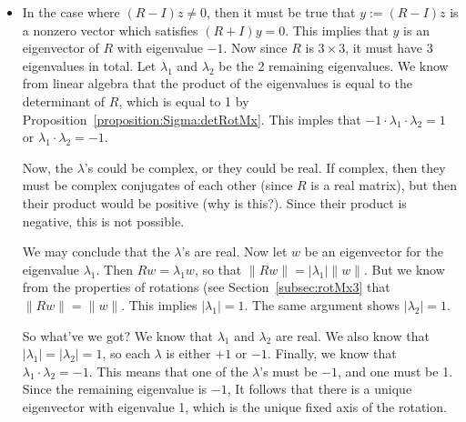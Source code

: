 \begin{itemize}
\item
In the case where $(R-I)z \neq 0$, then it must be true that $y := (R-I)z$ is a nonzero vector which satisfies $(R+I)y=0$. This implies that $y$ is an eigenvector of $R$ with eigenvalue $-1$. Now since $R$ is $3 \times 3$, it must have 3 eigenvalues in total. Let $\lambda_1$ and $\lambda_2$ be the 2 remaining eigenvalues.  We know from linear algebra that the product of the eigenvalues is equal to the determinant of $R$, which is equal to 1 by Proposition~\ref{proposition:Sigma:detRotMx}.  This imples that $-1 \cdot \lambda_1 \cdot \lambda_2 = 1$ or 
$ \lambda_1 \cdot \lambda_2 = -1$. 

Now, the $\lambda$'s could be complex, or they could be real. If complex, then they must be complex conjugates of each other (since $R$ is a real matrix), but then their product would be positive (why is this?). Since their product is negative, this is not possible. 

We may conclude that the $\lambda$'s are real. Now let $w$ be an eigenvector for the eigenvalue $\lambda_1$. Then $Rw = \lambda_1 w$, so that $ \lVert Rw \rVert = |\lambda_1| \lVert w \rVert$. But we know from the properties of rotations (see Section~\ref{subsec:rotMx3} that 
$ \lVert Rw \rVert =  \lVert w \rVert$. This implies $|\lambda_1|=1$. The same argument shows $|\lambda_2|=1$. 

So what've we got?  We know that $\lambda_1$ and $\lambda_2$ are real.  We also know that  $|\lambda_1|=|\lambda_2|=1$, so each $\lambda$ is either $+1$ or $-1$.  Finally, we know that $\lambda_1 \cdot \lambda_2 = -1$.  This means that one of the $\lambda$'s must be $-1$, and one must be 1. Since the remaining eigenvalue is $-1$, It follows that there is a unique eigenvector with eigenvalue 1, which is the unique fixed axis of the rotation.


\end{itemize}
